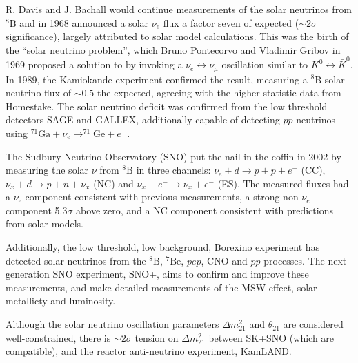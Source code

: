 R. Davis and J. Bachall would continue measurements of the solar neutrinos from $^{8}\text{B}$ and in 1968\cite{davis_sun} announced a solar $\nu_e$ flux a factor seven of expected ($\sim2\sigma$ significance), largely attributed to solar model calculations. This was the birth of the ``solar neutrino problem'', which Bruno Pontecorvo and Vladimir Gribov in 1969\cite{pontecorvo_gribov} proposed a solution to by invoking a $\nu_e\leftrightarrow\nu_\mu$ oscillation similar to $K^0 \leftrightarrow\bar{K}^0$. In 1989, the Kamiokande experiment\cite{kamiokande_solar} confirmed the result, measuring a $^{8}\text{B}$ solar neutrino flux of $\sim0.5$ the expected, agreeing with the higher statistic data from Homestake\cite{davis_sun2}. The solar neutrino deficit was confirmed from the low threshold detectors SAGE\cite{sage_solar} and GALLEX\cite{gallex_solar}, additionally capable of detecting $p p$ neutrinos using $^{71}\text{Ga}+\nu_e \rightarrow ^{71}\text{Ge}+e^-$.

The Sudbury Neutrino Observatory (SNO) put the nail in the coffin in 2002\cite{sno_solar} by measuring the solar $\nu$ from $^{8}\text{B}$ in three channels: $\nu_e + d \rightarrow p+p+e^-$ (CC), $\nu_x + d\rightarrow p+ n + \nu_x$ (NC) and $\nu_x + e^- \rightarrow \nu_x+e^-$ (ES). The measured fluxes had a $\nu_e$ component consistent with previous measurements, a strong non-$\nu_e$ component 5.3$\sigma$ above zero, and a NC component consistent with predictions from solar models.

Additionally, the low threshold, low background, Borexino experiment has detected solar neutrinos from the $^{8}\text{B}$, $^{7}\text{Be}$, $pep$, CNO and $pp$ processes\cite{borexino_summary}. The next-generation SNO experiment, SNO+, aims to confirm and improve these measurements, and make detailed measurements of the MSW effect, solar metallicty and luminosity.

Although the solar neutrino oscillation parameters $\Delta m^2_{21}$ and $\theta_{21}$ are considered well-constrained, there is $\sim 2\sigma$ tension on $\Delta m^2_{21}$ between SK+SNO (which are compatible), and the reactor anti-neutrino experiment, KamLAND\cite{m2_tension}.

